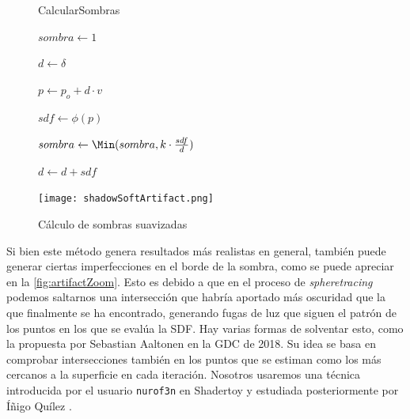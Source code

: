 \begin{figure}[ht!]
    \centering
    \begin{minipage}{0.50\textwidth}
       \begin{algorithm}[H]
            \caption{CalcularSombras}
                $sombra \gets 1$
                
                $d \gets \delta$ 
                
                 {
                    $p \gets p_o + d \cdot v$
                    
                    $sdf \gets \phi(p)$
                    
                    $sombra \gets \Min(sombra, k\cdot \frac{sdf}{d})$
                    
                    $d \gets d + sdf$

                }

        \end{algorithm}
    \end{minipage}%
    \hfill
    \begin{minipage}{0.48\textwidth}
        \texttt{[image: shadowSoftArtifact.png]}
    \end{minipage}
    \caption{Cálculo de sombras suavizadas}
    \label{fig:sombras2}
\end{figure}

Si bien este método genera resultados más realistas en general, también puede generar ciertas imperfecciones en el borde de la sombra, como se puede apreciar en la \autoref{fig:artifactZoom}. Esto es debido a que en el proceso de \textit{spheretracing} podemos saltarnos una intersección que habría aportado más oscuridad que la que finalmente se ha encontrado, generando fugas de luz que siguen el patrón de los puntos en los que se evalúa la SDF. Hay varias formas de solventar esto, como la propuesta por Sebastian Aaltonen \cite{claybook} en la GDC de 2018. Su idea se basa en comprobar intersecciones también en los puntos que se estiman como los más cercanos a la superficie en cada iteración. Nosotros usaremos una técnica introducida por el usuario \texttt{nurof3n} \cite{shadertoy-sombras} en Shadertoy y estudiada posteriormente por Íñigo Quílez \cite{article:shadow}.\newline


